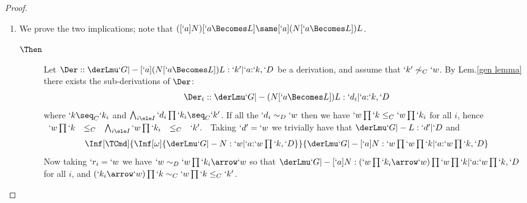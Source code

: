 \documentclass{lmcs}
\begin{document}
\begin{proof}
\begin{enumerate}
\begin{description}
 \end{description}

 \item %
We prove the two implications; note that $([`a]N)[`a\Becomes L] \same [`a](N[`a\Becomes L])L$.

 \begin{description}
 \item [$\Then$] 
Let $\Der :: \derLmu `G |- {[`a](N[`a\Becomes L])L} : `k' | `a{:}`k,`D $ be a derivation, and assume that $`k' \not\sim_C `w$. By Lem.\skp\ref{gen lemma} there exists the sub-derivations of $\Der$:
 \[ \begin{array}{rcl@{\quad}l}
\Der_i:: \derLmu `G |- {(N[`a \Becomes L])L} : `d_i | `a{:}`k,`D 
 \end{array} \]
where $`k \seq_C `k_i$ and $\bigwedge_{i\ele I} `d_i\prod`k_i \seq_C `k'$.
If all the $`d_i \sim_D `w$ then we have
$`w\prod `k \leq_C `w\prod `k_i$ for all $i$, hence
 $ \begin{array}{ccccc}
`w\prod `k &\leq_C& \bigwedge_{i\ele I}`w\prod `k_i &\leq_C& `k'.
 \end{array} $
Taking $`d' = `w$ we trivially have that $\derLmu `G |- L: `d' | `D $ and
 \[ \begin{array}{c}
\Inf	[\TCmd]
	{\Inf	[\omega]
{\derLmu `G |- N : `w | `a{:}`w\prod `k,`D }
	}{\derLmu `G |- {[`a]N} : `w\prod `w\prod `k | `a{:}`w\prod `k,`D }
 \end{array}\]
Now taking $`r_i = `w$ we have $`w \sim_D `w\prod `k_i\arrow `w$ so that
$\derLmu `G |- {[`a]N}: (`w\prod `k_i\arrow `w)\prod `w\prod `k | `a{:}`w\prod `k,`D $ for all $i$, and
$(`k_i\arrow `w)\prod `k \sim_C `w\prod `k \leq_C `k'$.


\end{description}
\end{enumerate}
\end{proof}
\end{document}
